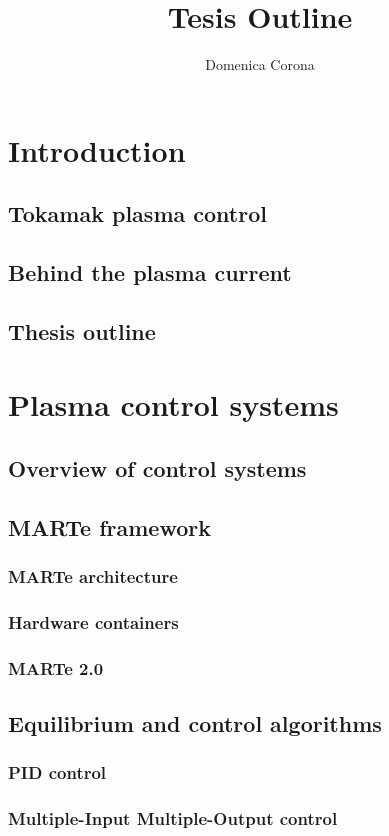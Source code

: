 \documentclass{article}
\title{Tesis Outline}
\author{Domenica Corona }
\begin{document}
\maketitle

\section{Introduction}
\subsection{Tokamak plasma control }
\subsection{Behind the plasma current}
\subsection{Thesis outline}
\hfil


\section{Plasma control systems}
\subsection{Overview of control systems}
\subsection{MARTe framework}
\subsubsection{MARTe architecture }
\subsubsection{Hardware containers}
\subsubsection{MARTe 2.0}
\subsection{Equilibrium and control algorithms} 
\subsubsection{PID control}
\subsubsection{Multiple-Input Multiple-Output control}
 
\end{document}
